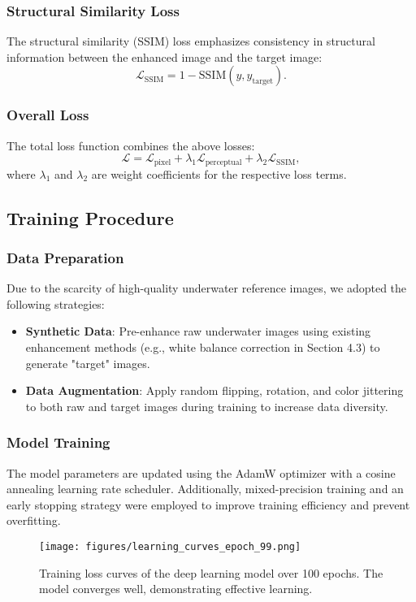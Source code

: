 \documentclass{apmcmthesis}
\begin{document}
\subsubsection{Structural Similarity Loss}
The structural similarity (SSIM) loss emphasizes consistency in structural information between the enhanced image and the target image:
\[
\mathcal{L}_{\text{SSIM}} = 1 - \text{SSIM}(y, y_{\text{target}}).
\]

\subsubsection{Overall Loss}
The total loss function combines the above losses:
\[
\mathcal{L} = \mathcal{L}_{\text{pixel}} + \lambda_1 \mathcal{L}_{\text{perceptual}} + \lambda_2 \mathcal{L}_{\text{SSIM}},
\]
where $\lambda_1$ and $\lambda_2$ are weight coefficients for the respective loss terms.

\subsection{Training Procedure}

\subsubsection{Data Preparation}
Due to the scarcity of high-quality underwater reference images, we adopted the following strategies:
\begin{itemize}
    \item \textbf{Synthetic Data}: Pre-enhance raw underwater images using existing enhancement methods (e.g., white balance correction in Section 4.3) to generate "target" images.
    \item \textbf{Data Augmentation}: Apply random flipping, rotation, and color jittering to both raw and target images during training to increase data diversity.
\end{itemize}

\subsubsection{Model Training}
The model parameters are updated using the AdamW optimizer with a cosine annealing learning rate scheduler. Additionally, mixed-precision training and an early stopping strategy were employed to improve training efficiency and prevent overfitting.

\begin{figure}[!ht]
    \centering
    \texttt{[image: figures/learning\_curves\_epoch\_99.png]}
    \caption{ Training loss curves of the deep learning model over 100 epochs. The model converges well, demonstrating effective learning.}
    \label{fig:example_6}
\end{figure}
\end{document}
